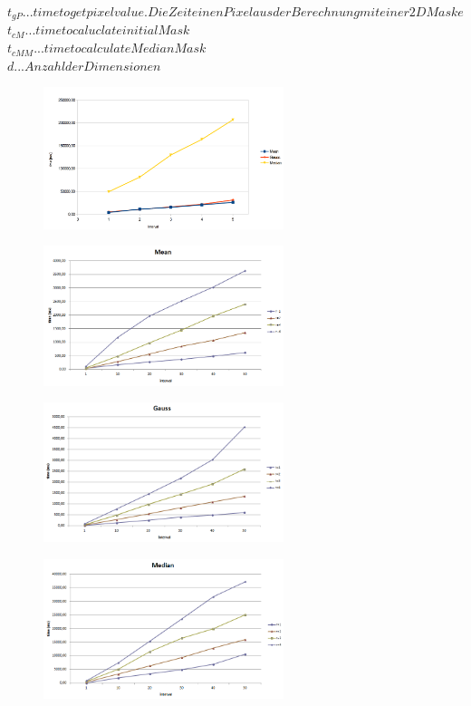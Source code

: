\documentclass[12pt,german]{article}
\begin{document}
\begin{center}
	$t_{gP} ... time to get pixel value. Die Zeit einen Pixel aus der Berechnung mit einer 2D Maske  $ \\
	$t_{cM} ... time to caluclate initial Mask$ \\
	$t_{cMM} ... time to calculate MedianMask $ \\
	$d ... Anzahl der Dimensionen$ \\
\end{center}

\begin{figure}[h]
	\includegraphics[width=7cm]{TimeEvaluationGraph_allBig.png}
\end{figure}

\begin{figure}[h]
	\includegraphics[width=7cm]{TimeEvaluationGraph_Mean.png}
\end{figure}
\begin{figure}[h]
	\includegraphics[width=7cm]{TimeEvaluationGraph_Gauss.png}
\end{figure}
\begin{figure}[h]
	\includegraphics[width=7cm]{TimeEvaluationGraph_Median.png}
\end{figure}
\end{document}
